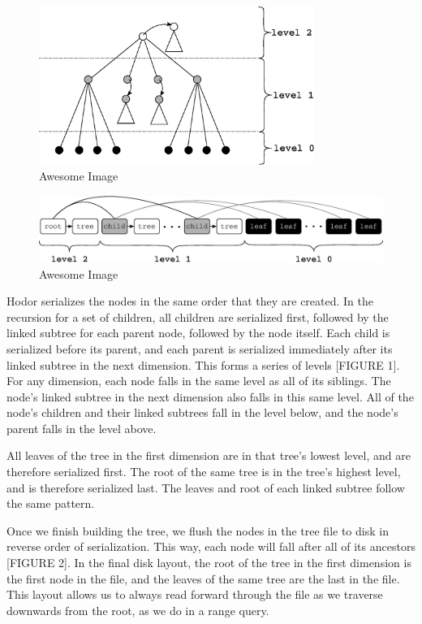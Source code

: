 \documentclass[11pt, oneside]{article}
\begin{document}
\begin{figure}[p]
    \centering
    \includegraphics[width=0.8\textwidth]{fig1.eps}
    \caption{Awesome Image}
\end{figure}
\begin{figure}[p]
    \centering
    \includegraphics[width=1\textwidth]{fig2.eps}
    \caption{Awesome Image}
\end{figure}

Hodor serializes the nodes in the same order that they are created. In the
recursion for a set of children, all children are serialized first, followed by
the linked subtree for each parent node, followed by the node itself. Each
child is serialized before its parent, and each parent is serialized
immediately after its linked subtree in the next dimension. This forms a series
of levels [FIGURE 1]. For any dimension, each node falls in the same level as
all of its siblings. The node's linked subtree in the next dimension also falls
in this same level. All of the node's children and their linked subtrees fall
in the level below, and the node's parent falls in the level above. 

All leaves of the tree in the first dimension are in that tree's lowest level,
and are therefore serialized first. The root of the same tree is in the tree's
highest level, and is therefore serialized last. The leaves and root of each
linked subtree follow the same pattern. 

Once we finish building the tree, we flush the nodes in the tree file to disk
in reverse order of serialization. This way, each node will fall after all of
its ancestors [FIGURE 2]. In the final disk layout, the root of the tree in the
first dimension is the first node in the file, and the leaves of the same tree
are the last in the file. This layout allows us to always read forward through
the file as we traverse downwards from the root, as we do in a range query.
\end{document}

